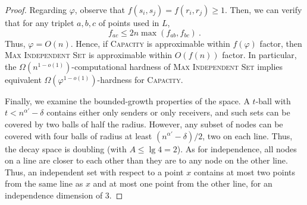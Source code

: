 \documentclass[11pt]{amsart}
\newcommand{\prob}[1]{\textsc{#1}}
\begin{document}
\begin{proof}
Regarding $\varphi$, observe that $f(s_i,s_j) = f(r_i,r_j) \ge 1$.
Then, we can verify that for any triplet $a,b,c$ of points used in $L$,
\[ f_{ac} \le 2 n \max(f_{ab},f_{bc}) \ . \]
Thus, $\varphi = O(n)$.
Hence, if \prob{Capacity} is approximable within $f(\varphi)$ factor,
then \prob{Max Independent Set} is approximable within $O(f(n))$ factor.
In particular, the $\Omega(n^{1-o(1)})$-computational hardness of \prob{Max Independent
Set} \cite{khot2006better} implies equivalent $\Omega(\varphi^{1-o(1)})$-hardness for \prob{Capacity}.

Finally, we examine the bounded-growth properties of the space. 
A $t$-ball with $t < n^{\alpha'}-\delta$ contains either only senders or
only receivers, and such sets can be covered by two balls of half the radius.
However, any subset of nodes can be covered with four balls of radius
at least $(n^{\alpha'}-\delta)/2$, two on each line. Thus, the decay
space is doubling (with $A \le \lg 4 = 2$).
As for independence, all nodes on a line are closer to each other than
they are to any node on the other line. Thus, an independent set with
respect to a point $x$ contains at most two points from the same line
as $x$ and at most one point from the other line, for an independence
dimension of 3.
\end{proof}
\end{document}
